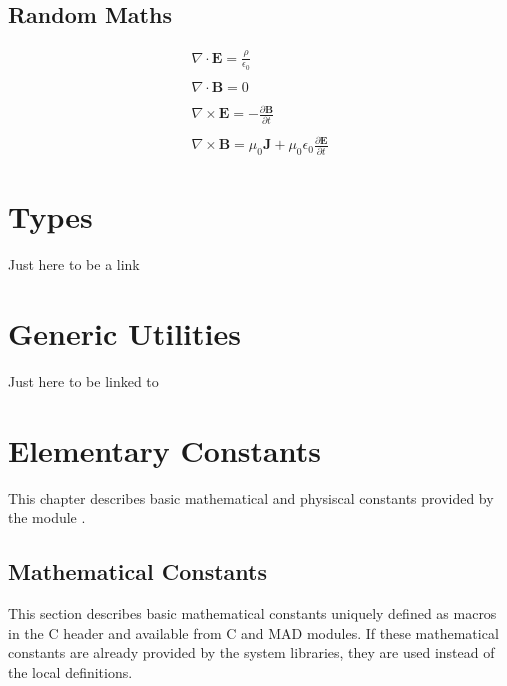 \documentclass[letterpaper,10pt,english]{sphinxmanual}
\begin{document}
\section{Random Maths}
\label{\detokenize{sequences:random-maths}}\begin{equation*}
\begin{split}\nabla \cdot \textbf{E} = \frac{\rho}{\epsilon_0}\\\\
\nabla \cdot \textbf{B} = 0\\\\
\nabla \times \textbf{E} =- \frac{\partial \textbf{B}}{\partial t}\\\\
\nabla \times \textbf{B} = \mu_0 \textbf{J} + \mu_0 \epsilon_0 \frac{\partial \textbf{E}}{\partial t}\end{split}
\end{equation*}
\sphinxstepscope


\chapter{Types}
\label{\detokenize{types:types}}\label{\detokenize{types::doc}}
\sphinxAtStartPar
Just here to be a link

\sphinxstepscope


\chapter{Generic Utilities}
\label{\detokenize{utility:generic-utilities}}\label{\detokenize{utility::doc}}
\sphinxAtStartPar
Just here to be linked to

\sphinxstepscope

\ignorespaces 

\chapter{Elementary Constants}
\label{\detokenize{constants:elementary-constants}}\label{\detokenize{constants:index-0}}\label{\detokenize{constants::doc}}
\sphinxAtStartPar
This chapter describes basic mathematical and physiscal constants provided by the module .


\section{Mathematical Constants}
\label{\detokenize{constants:mathematical-constants}}
\sphinxAtStartPar
This section describes basic mathematical constants uniquely defined as macros in the C header  and available from C and MAD modules. If these mathematical constants are already provided by the system libraries, they are used instead of the local definitions.
\end{document}
